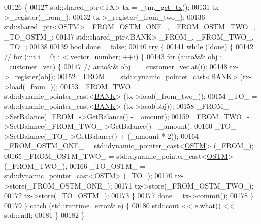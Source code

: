 \begin{DoxyCode}
00126                                                                                                            
                                                                \{
00127     std::shared\_ptr<TX> tx = \_tm.\hyperlink{class_t_m_a41cb0226cc4080c931651b13f74a0075_a41cb0226cc4080c931651b13f74a0075}{\_get\_tx}();
00131     tx->\_register(\_from\_);
00132     tx->\_register(\_from\_two\_);
00136     std::shared\_ptr<OSTM> \_FROM\_OSTM\_ONE\_, \_FROM\_OSTM\_TWO\_, \_TO\_OSTM\_;
00137     std::shared\_ptr<BANK> \_FROM\_, \_FROM\_TWO\_, \_TO\_;
00138 
00139     \textcolor{keywordtype}{bool} done = \textcolor{keyword}{false};
00140     \textcolor{keywordflow}{try} \{
00141         \textcolor{keywordflow}{while} (!done) \{
00142             \textcolor{comment}{// for (int i = 0; i < vector\_number; ++i) \{}
00143             \textcolor{keywordflow}{for} (\textcolor{keyword}{auto}&& obj : \_customer\_vec) \{
00147                 \textcolor{comment}{// auto&& obj = \_customer\_vec.at(i);}
00148                 tx->\_register(obj);
00152                 \_FROM\_ = std::dynamic\_pointer\_cast<\hyperlink{class_b_a_n_k}{BANK}> (tx->load(\_from\_));
00153                 \_FROM\_TWO\_ = std::dynamic\_pointer\_cast<\hyperlink{class_b_a_n_k}{BANK}> (tx->load(\_from\_two\_));
00154                 \_TO\_ = std::dynamic\_pointer\_cast<\hyperlink{class_b_a_n_k}{BANK}> (tx->load(obj));
00158                 \_FROM\_->\hyperlink{class_b_a_n_k_ae3e45b407bf8ec7175662442ea24b7c0_ae3e45b407bf8ec7175662442ea24b7c0}{SetBalance}(\_FROM\_->GetBalance() - \_amount);
00159                 \_FROM\_TWO\_->SetBalance(\_FROM\_TWO\_->GetBalance() - \_amount);
00160                 \_TO\_->SetBalance(\_TO\_->GetBalance() + (\_amount * 2));
00164                 \_FROM\_OSTM\_ONE\_ = std::dynamic\_pointer\_cast<\hyperlink{class_o_s_t_m}{OSTM}> (\_FROM\_);
00165                 \_FROM\_OSTM\_TWO\_ = std::dynamic\_pointer\_cast<\hyperlink{class_o_s_t_m}{OSTM}> (\_FROM\_TWO\_);
00166                 \_TO\_OSTM\_ = std::dynamic\_pointer\_cast<\hyperlink{class_o_s_t_m}{OSTM}> (\_TO\_);
00170                 tx->store(\_FROM\_OSTM\_ONE\_);
00171                 tx->store(\_FROM\_OSTM\_TWO\_);
00172                 tx->store(\_TO\_OSTM\_);
00173             \}
00177             done = tx->commit();
00178         \}
00179     \} \textcolor{keywordflow}{catch} (std::runtime\_error& e) \{
00180         std::cout << e.what() << std::endl;
00181     \}
00182 \}
\end{DoxyCode}


